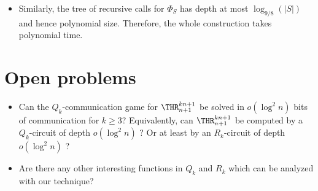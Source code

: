 \begin{itemize}
\item Similarly, the tree of recursive calls for $\Phi_S$ has depth at most $\log_{9/8}(|S|)$ and hence polynomial size. Therefore, the whole construction takes polynomial time.
\end{itemize}


\section{Open problems} \label{sec:open_prob}

\begin{itemize}
\item Can the $Q_k$-communication game for $\THR^{kn + 1}_{n + 1}$ be solved in $o(\log^2 n)$ bits of communication for $k\ge 3$? Equivalently, can $\THR^{kn + 1}_{n + 1}$ be computed by 
%
a $Q_k$-circuit of depth $o(\log^2 n)$ ?  %
Or at least by %
an $R_k$-circuit of depth $o(\log^2 n)$ ?  %

\item Are there any other interesting functions in $Q_k$ and $R_k$ which can be analyzed with our technique?
\end{itemize}
